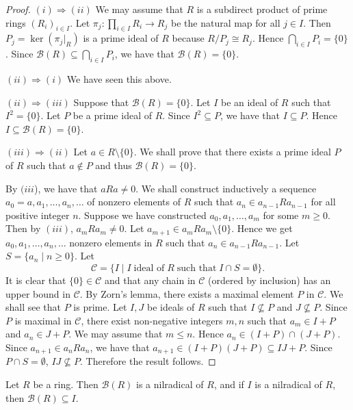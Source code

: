 \begin{proof}
$(i)\Rightarrow (ii)$ We may assume that $R$ is a subdirect product of prime rings $(R_i)_{i\in I}$. Let $\pi_j\colon\prod_{i\in I}R_i\rightarrow R_j$ be the natural map for all $j\in I$. Then $P_j=\ker(\pi_j|_R)$ is a prime ideal of $R$ because $R/P_j\cong R_j$.
Hence $\bigcap_{i\in I}P_i=\{0\}$. Since $\mathcal{B}(R)\subseteq \bigcap_{i\in I}P_i$, we have that $\mathcal{B}(R)=\{0\}$.

$(ii)\Rightarrow (i)$ We have seen this above.


$(ii)\Rightarrow (iii)$ Suppose that $\mathcal{B}(R)=\{0\}$. Let $I$ be an ideal of $R$ such that $I^2=\{0\}$.
Let $P$ be a prime ideal of $R$. Since  $I^2\subseteq P$, we have that
$I\subseteq P$. Hence $I\subseteq \mathcal{B}(R)=\{0\}$.

$(iii)\Rightarrow (ii)$ Let $a\in R\setminus\{ 0\}$. We shall prove that there exists a prime ideal $P$ of $R$
such that $a\notin P$ and thus $\mathcal{B}(R)=\{0\}$.

By $(iii$), we have that $aRa\neq 0$. We shall construct inductively a sequence $a_0=a,a_1,\dots ,a_n,\dots$ of nonzero elements of $R$ such that
$a_n\in a_{n-1}Ra_{n-1}$ for all positive integer $n$. Suppose we have constructed
 $a_0,a_1,\dots,a_m$ for some $m\geq 0$. Then by $(iii)$,
$a_mRa_m\neq 0$. Let $a_{m+1}\in a_mRa_m\setminus\{ 0\}$. Hence we get $a_0,a_1,\dots,a_n,\dots$ nonzero elements in $R$
such that $a_n\in a_{n-1}Ra_{n-1}$. Let $S=\{ a_n\mid n\geq
0\}$. Let
$$\mathcal{C}=\{ I\mid I\;\mbox{ideal of}\; R\;\mbox{such that}\; I\cap
S=\emptyset \} .$$
It is clear that $\{0\}\in \mathcal{C}$ and that any chain in $\mathcal{C}$ (ordered by inclusion) has an upper bound in $\mathcal{C}$.
By Zorn's lemma, there exists a maximal element $P$ in $\mathcal{C}$. We shall see that $P$ is prime. Let $I,J$ be ideals
of $R$ such that $I\not\subseteq P$ and $J\not\subseteq P$. Since $P$
is maximal in $\mathcal{C}$, there exist non-negative integers $m,n$ such that
$a_m\in I+P$ and $a_n\in J+P$. We may assume that $m\leq n$. Hence
$a_n\in (I+P)\cap (J+P)$. Since $a_{n+1}\in a_nRa_n$, we have that
$a_{n+1}\in (I+P)(J+P)\subseteq IJ+P$. Since $P\cap S=\emptyset$,
$IJ\not\subseteq P$. Therefore the result follows.  
\end{proof}

\begin{proposition}\label{Prop1.3.7}
Let $R$ be a ring. Then $\mathcal{B}(R)$ is a nilradical of $R$, and
if $I$ is a nilradical of $R$, then $\mathcal{B}(R)\subseteq I$.
\end{proposition}

